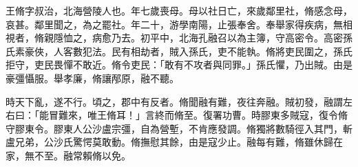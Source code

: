 \begin{pinyinscope}
 
 
 王脩字叔治，北海營陵人也。年七歲喪母。母以社日亡，來歲鄰里社，脩感念母，哀甚。鄰里聞之，為之罷社。年二十，游學南陽，止張奉舍。奉舉家得疾病，無相視者，脩親隱恤之，病愈乃去。初平中，北海孔融召以為主簿，守高密令。高密孫氏素豪俠，人客數犯法。民有相劫者，賊入孫氏，吏不能執。脩將吏民圍之，孫氏拒守，吏民畏憚不敢近。脩令吏民：「敢有不攻者與同罪。」孫氏懼，乃出賊。由是豪彊懾服。舉孝廉，脩讓邴原，融不聽。
 
 
 時天下亂，遂不行。頃之，郡中有反者。脩聞融有難，夜往奔融。賊初發，融謂左右曰：「能冒難來，唯王脩耳！」言終而脩至。復署功曹。時膠東多賊寇，復令脩守膠東令。膠東人公沙盧宗彊，自為營塹，不肯應發調。脩獨將數騎徑入其門，斬盧兄弟，公沙氏驚愕莫敢動。脩撫慰其餘，由是寇少止。融每有難，脩雖休歸在家，無不至。融常賴脩以免。
 

\end{pinyinscope}
